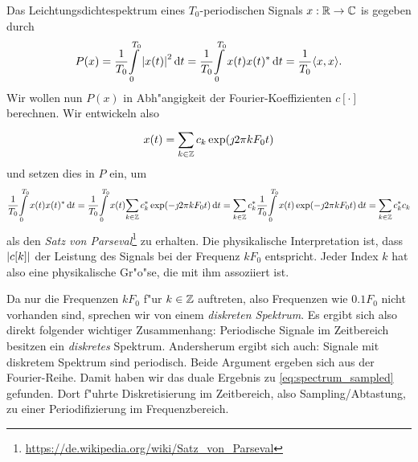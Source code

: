 Das Leichtungsdichtespektrum eines $T_0$-periodischen Signals $x: \mathbb{R} \rightarrow \mathbb{C}$ is gegeben durch
\begin{equation}\label{eq:fourier:period_psd}
P(x) = \frac{1}{T_0}{\int\limits_{0}^{T_0}{{\left| x(t) \right|}^2}\,\mathrm{d}{t}}
     = \frac{1}{T_0}{\int\limits_{0}^{T_0}{x(t) x(t)^\ast}\,\mathrm{d}{t}}
     = \frac{1}{T_0} {\left\langle x,x \right\rangle}.
\end{equation}
Wir wollen nun $P(x)$ in Abh"angigkeit der Fourier-Koeffizienten $c[\cdot]$ berechnen.
Wir entwickeln also
\[
x(t) = {\sum\limits_{k \in \mathbb{Z}}^{}{
    c_k \exp(\jmath 2 \pi k F_0 t)
}}
\]
und setzen dies in $P$ ein, um
%
\begin{equation}\label{eq:fourier:series_parseval}
    \frac{1}{T_0}{\int\limits_{0}^{T_0}{x(t) x(t)^\ast}\,\mathrm{d}{t}}
        = \frac{1}{T_0}{\int\limits_{0}^{T_0}{
            x(t) 
            {\sum\limits_{k \in \mathbb{Z}}^{}{
                c_k^\ast \exp(-\jmath 2 \pi k F_0 t)
            }}
        }\,\mathrm{d}{t}}
        = {\sum\limits_{k \in \mathbb{Z}}^{}{
            c_k^\ast 
            \frac{1}{T_0}{\int\limits_{0}^{T_0}{
                x(t)
                \exp(-\jmath 2 \pi k F_0 t)
            }\,\mathrm{d}{t}}
        }}
        = {\sum\limits_{k \in \mathbb{Z}}^{}{
            c_k^\ast c_k
        }}
\end{equation}
%
als den \emph{Satz von Parseval}\footnote{\url{https://de.wikipedia.org/wiki/Satz\_von\_Parseval}} zu erhalten.
Die physikalische Interpretation ist, dass ${\left| c[k] \right|}$ der Leistung des Signals bei der Frequenz $k F_0$ entspricht.
Jeder Index $k$ hat also eine physikalische Gr"o"se, die mit ihm assoziiert ist.

Da nur die Frequenzen $k F_0$ f"ur $k \in \mathbb{Z}$ auftreten, also Frequenzen wie $0.1 F_0$ nicht vorhanden sind, sprechen wir von einem \emph{diskreten Spektrum}.
Es ergibt sich also direkt folgender wichtiger Zusammenhang: Periodische Signale im Zeitbereich besitzen ein \emph{diskretes} Spektrum.
Andersherum ergibt sich auch: Signale mit diskretem Spektrum sind periodisch.
Beide Argument ergeben sich aus der Fourier-Reihe.
Damit haben wir das duale Ergebnis zu \eqref{eq:spectrum_sampled} gefunden.
Dort f"uhrte Diskretisierung im Zeitbereich, also Sampling/Abtastung, zu einer Periodifizierung im Frequenzbereich.

